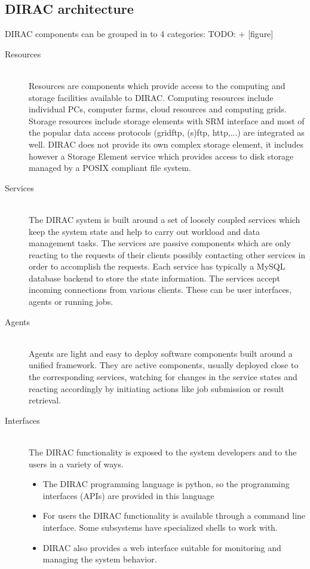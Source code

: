 \subsection{DIRAC architecture}
DIRAC components can be grouped in to 4 categories: TODO: + [figure] %
\begin{description}

\item[Resources] \hfill \\
Resources are components which provide access to the computing and storage facilities available to
DIRAC. Computing resources include individual PCs, computer farms, cloud resources and computing grids. Storage 
resources include storage elements with SRM interface \cite{SRM} and most of the popular data access 
protocols (gridftp, (s)ftp, http,...) are integrated as well. DIRAC does not provide its own complex 
storage element, it includes however a Storage Element service which provides access to disk 
storage managed by a POSIX compliant file system.

\item[Services] \hfill \\
The DIRAC system is built around a set of loosely coupled services which keep the system state and
help to carry out workload and data management tasks. The services are passive components which
are only reacting to the requests of their clients possibly contacting other services in order to
accomplish the requests. Each service has typically a MySQL database backend to store the state
information. The services accept incoming connections from various clients. These can be user interfaces,
agents or running jobs. 

\item[Agents] \hfill \\
Agents are light and easy to deploy software components built around a unified framework. They are active
components, usually deployed close to the corresponding services, watching for changes in the service states and 
reacting accordingly by initiating actions like job submission or result retrieval. 

\item[Interfaces] \hfill \\
The DIRAC functionality is exposed to the system developers and to the users in a variety of ways. 
	\begin{itemize}
	\item The DIRAC programming language is python, so the programming interfaces (APIs) are provided in this 		
		language
	\item For users the DIRAC functionality is available through a command line interface. Some subsystems 		
		have specialized shells to work with.
	\item DIRAC also provides a web interface suitable for monitoring and managing the system behavior.
	\end{itemize}

\end{description}

